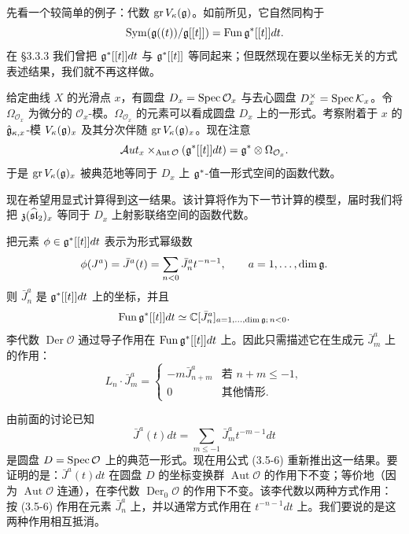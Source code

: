 先看一个较简单的例子：代数 $\operatorname{gr}V_\kappa(\mathfrak{g})$。如前所见，它自然同构于
\[
    \operatorname{Sym}(\mathfrak{g}((t))/\mathfrak{g}[[t]])=\operatorname{Fun}\mathfrak{g}^*[[t]]dt .
\]
在 §3.3.3 我们曾把 $\mathfrak{g}^*[[t]]dt$ 与 $\mathfrak{g}^*[[t]]$ 等同起来；但既然现在要以坐标无关的方式表述结果，我们就不再这样做。


给定曲线 $X$ 的光滑点 $x$，有圆盘 $D_x=\operatorname{Spec}\mathcal{O}_x$ 与去心圆盘 $D_x^\times=\operatorname{Spec}\mathcal{K}_x$。令 $\Omega_{\mathcal{O}_x}$ 为微分的 $\mathcal{O}_x$-模。$\Omega_{\mathcal{O}_x}$ 的元素可以看成圆盘 $D_x$ 上的一形式。考察附着于 $x$ 的 $\hat{\mathfrak{g}}_{\kappa,x}$-模 $V_\kappa(\mathfrak{g})_x$ 及其分次伴随 $\operatorname{gr}V_\kappa(\mathfrak{g})_x$。现在注意
\[
    \mathcal{A}ut_x\times_{\operatorname{Aut}\mathcal{O}}(\mathfrak{g}^*[[t]]dt)=\mathfrak{g}^*\otimes\Omega_{\mathcal{O}_x}.
\]
于是 $\operatorname{gr}V_\kappa(\mathfrak{g})_x$ 被典范地等同于 $D_x$ 上 $\mathfrak{g}^*$-值一形式空间的函数代数。

现在希望用显式计算得到这一结果。该计算将作为下一节计算的模型，届时我们将把 $\mathfrak{z}(\widehat{\mathfrak{sl}}_2)_x$ 等同于 $D_x$ 上射影联络空间的函数代数。

把元素 $\phi\in\mathfrak{g}^*[[t]]dt$ 表示为形式幂级数
\[
    \phi(J^a)=\bar J^a(t)=\sum_{n<0}\bar J^a_n t^{-n-1},\qquad a=1,\dots,\dim\mathfrak{g} .
\]
则 $\bar J^a_n$ 是 $\mathfrak{g}^*[[t]]dt$ 上的坐标，并且
\[
    \operatorname{Fun}\mathfrak{g}^*[[t]]dt\simeq\mathbb{C}[\bar J^a_n]_{a=1,\dots,\dim\mathfrak{g};\,n<0}.
\]
李代数 $\operatorname{Der}\mathcal{O}$ 通过导子作用在 $\operatorname{Fun}\mathfrak{g}^*[[t]]dt$ 上。因此只需描述它在生成元 $\bar J^a_m$ 上的作用：
\begin{equation}
    L_n\cdot\bar J^a_m=
    \begin{cases}
        -m\bar J^a_{n+m} & \text{若 } n+m\le -1,\\
        0 & \text{其他情形}.
    \end{cases}
    \tag{3.5-6}
\end{equation}

由前面的讨论已知
\[
    \bar J^a(t)dt=\sum_{m\le -1}\bar J^a_m t^{-m-1}dt
\]
是圆盘 $D=\operatorname{Spec}\mathcal{O}$ 上的典范一形式。现在用公式 (3.5-6) 重新推出这一结果。要证明的是：$\bar J^a(t)dt$ 在圆盘 $D$ 的坐标变换群 $\operatorname{Aut}\mathcal{O}$ 的作用下不变；等价地（因为 $\operatorname{Aut}\mathcal{O}$ 连通），在李代数 $\operatorname{Der}_0\mathcal{O}$ 的作用下不变。该李代数以两种方式作用：按 (3.5-6) 作用在元素 $\bar J^a_n$ 上，并以通常方式作用在 $t^{-n-1}dt$ 上。我们要说的是这两种作用相互抵消。

